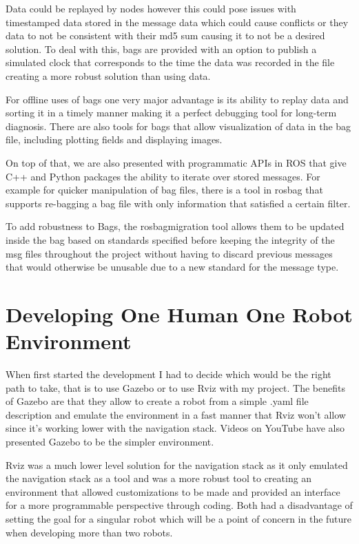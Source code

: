 \documentclass{report}
\begin{document}
      Data could be replayed by nodes however this could pose issues with timestamped data stored in the message data which could cause conflicts or they data to not be consistent with their md5 sum causing it to not be a desired solution. To deal with this, bags are provided with an option to publish a simulated clock that corresponds to the time the data was recorded in the file creating a more robust solution than using data.

      For offline uses of bags one very major advantage is its ability to replay data and sorting it in a timely manner making it a perfect debugging tool for long-term diagnosis. There are also tools for bags that allow visualization of data in the bag file, including plotting fields and displaying images.

      On top of that, we are also presented with programmatic APIs in ROS that give C++ and Python packages the ability to iterate over stored messages. For example for quicker manipulation of bag files, there is a tool in rosbag that supports re-bagging a bag file with only information that satisfied a certain filter.

      To add robustness to Bags, the rosbagmigration tool allows them to be updated inside the bag based on standards specified before keeping the integrity of the msg files throughout the project without having to discard previous messages that would otherwise be unusable due to a new standard for the message type.

  \chapter{Developing One Human One Robot Environment}

  When first started the development I had to decide which would be the right path to take, that is to use Gazebo\cite{gazebo} or to use Rviz\cite{Rviz} with my project. The benefits of Gazebo are that they allow to create a robot from a simple .yaml file description and emulate the environment\cite{gazeboYaml} in a fast manner that Rviz won't allow since it's working lower with the navigation stack. Videos on YouTube have also presented Gazebo\cite{gazeboPresentation} to be the simpler environment.

  Rviz was a much lower level solution for the navigation stack as it only emulated the navigation stack as a tool and was a more robust tool to creating an environment that allowed customizations\cite{navTuts} to be made and provided an interface for a more programmable perspective through coding. Both had a disadvantage of setting the goal for a singular robot which will be a point of concern in the future when developing more than two robots.
\end{document}
